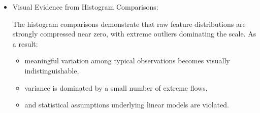 \documentclass[
  letterpaper,
  DIV=11,
  numbers=noendperiod]{scrartcl}
\providecommand{\tightlist}{%
  \setlength{\itemsep}{0pt}\setlength{\parskip}{0pt}}
\begin{document}
\begin{enumerate}
\begin{itemize}
    \begin{itemize}
    \item
      Many traffic-volume and packet aggregation features exhibit
      \textbf{extremely large skewness values}, exceeding 200--300 in
      magnitude. Notably:

      \begin{itemize}
      \tightlist
      \item
        \texttt{bwd\_bulk\_bytes}
      \item
        \texttt{bwd\_bulk\_packets}
      \item
        \texttt{active.std}
      \item
        \texttt{*\_pkts\_payload.tot}
      \item
        \texttt{*\_pkts\_tot}
      \item
        \texttt{bwd\_header\_size\_tot}
      \end{itemize}
    \item
      These values indicate highly asymmetric distributions
      characterized by:

      \begin{itemize}
      \tightlist
      \item
        a large concentration of observations near zero,
      \item
        long right tails containing rare but extremely large values,
      \item
        and heavy-tailed behavior typical of bursty network traffic.
      \end{itemize}
    \end{itemize}

    Such distributions are expected in real-world network telemetry,
    where most flows are small while a minority of flows generate
    disproportionately large traffic volumes.
  \item
    Visual Evidence from Histogram Comparisons:

    The histogram comparisons demonstrate that raw feature distributions
    are strongly compressed near zero, with extreme outliers dominating
    the scale. As a result:

    \begin{itemize}
    \tightlist
    \item
      meaningful variation among typical observations becomes visually
      indistinguishable,
    \item
      variance is dominated by a small number of extreme flows,
    \item
      and statistical assumptions underlying linear models are violated.
    \end{itemize}


\end{itemize}
\end{enumerate}
\end{document}
